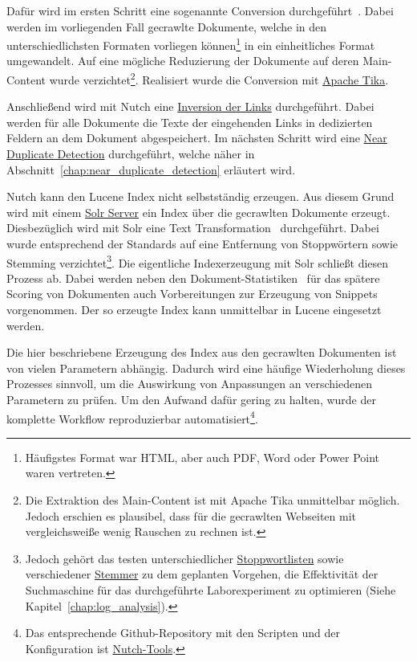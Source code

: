 Dafür wird im ersten Schritt eine sogenannte Conversion durchgeführt~\cite{croft.chap2}.
Dabei werden im vorliegenden Fall gecrawlte Dokumente,
welche in den unterschiedlichsten Formaten vorliegen können\footnote{Häufigstes Format war HTML, aber auch PDF, Word oder Power Point waren vertreten.}
in ein einheitliches Format umgewandelt.
Auf eine mögliche Reduzierung der Dokumente auf deren Main-Content wurde
verzichtet\footnote{Die Extraktion des Main-Content ist mit Apache Tika
unmittelbar möglich. Jedoch erschien es plausibel, dass für die gecrawlten Webseiten mit vergleichsweiße wenig Rauschen zu rechnen ist.}.
Realisiert wurde die Conversion mit \href{https://en.wikipedia.org/wiki/Apache_Tika}{Apache Tika}.

Anschließend wird mit Nutch eine \href{https://wiki.apache.org/nutch/bin/nutch_invertlinks}{Inversion der Links} durchgeführt.
Dabei werden für alle Dokumente die Texte der eingehenden Links in dedizierten Feldern an dem Dokument abgespeichert.
Im nächsten Schritt wird eine \href{https://github.com/apache/nutch/blob/master/src/java/org/apache/nutch/crawl/TextProfileSignature.java}{Near Duplicate Detection}
durchgeführt, welche näher in Abschnitt~\ref{chap:near_duplicate_detection} erläutert wird.

Nutch kann den Lucene Index nicht selbstständig erzeugen.
Aus diesem Grund wird mit einem \href{http://lucene.apache.org/solr/}{Solr Server} ein Index über die gecrawlten Dokumente erzeugt.
Diesbezüglich wird mit Solr eine Text Transformation~\cite{croft.chap2} durchgeführt.
Dabei wurde entsprechend der Standards auf eine Entfernung von Stoppwörtern sowie Stemming
verzichtet\footnote{Jedoch gehört das testen unterschiedlicher 
\href{https://github.com/apache/lucene-solr/blob/master/lucene/analysis/common/src/java/org/apache/lucene/analysis/core/StopFilterFactory.java}{Stoppwortlisten} sowie verschiedener
\href{https://github.com/apache/lucene-solr/blob/master/lucene/analysis/common/src/java/org/apache/lucene/analysis/en/PorterStemFilterFactory.java}{Stemmer}
zu dem geplanten Vorgehen,
die Effektivität der Suchmaschine für das durchgeführte Laborexperiment zu optimieren (Siehe Kapitel~\ref{chap:log_analysis}).}.
Die eigentliche Indexerzeugung mit Solr schließt diesen Prozess ab.
Dabei werden neben den Dokument-Statistiken~\cite{croft.chap2} für das spätere Scoring von Dokumenten auch Vorbereitungen zur Erzeugung von Snippets vorgenommen.
Der so erzeugte Index kann unmittelbar in Lucene eingesetzt werden.

Die hier beschriebene Erzeugung des Index aus den gecrawlten Dokumenten ist von vielen Parametern abhängig.
Dadurch wird eine häufige Wiederholung dieses Prozesses sinnvoll, um die Auswirkung von Anpassungen an verschiedenen Parametern zu prüfen.
Um den Aufwand dafür gering zu halten, wurde der komplette Workflow reproduzierbar automatisiert\footnote{Das
entsprechende Github-Repository mit
den Scripten und der Konfiguration ist \href{https://github.com/mam10eks/nutch_tools/}{Nutch-Tools}.}.

